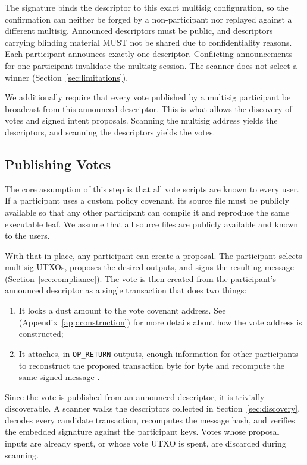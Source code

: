 \documentclass[11pt]{article}
\begin{document}
    The signature binds the descriptor to this exact multisig configuration, so the confirmation can neither be forged by a non-participant nor replayed against a different multisig. Announced descriptors must be public, and descriptors carrying blinding material MUST not be shared due to confidentiality reasons. Each participant announces exactly one descriptor. Conflicting announcements for one participant invalidate the multisig session. The scanner does not select a winner (Section~\ref{sec:limitations}).

    We additionally require that every vote published by a multisig participant be broadcast from this announced descriptor. This is what allows the discovery of votes and signed intent proposals. Scanning the multisig address yields the descriptors, and scanning the descriptors yields the votes.

    \subsection{Publishing Votes}
    \label{sec:votes}

    The core assumption of this step is that all vote scripts are known to every user. If a participant uses a custom policy covenant, its source file must be publicly available so that any other participant can compile it and reproduce the same executable leaf. We assume that all source files are publicly available and known to the users.

    With that in place, any participant can create a proposal. The participant selects multisig UTXOs, proposes the desired outputs, and signs the resulting message (Section~\ref{sec:compliance}). The vote is then created from the participant's announced descriptor as a single transaction that does two things:

    \begin{enumerate}
        \item It locks a dust amount to the vote covenant address. See  (Appendix~\ref{app:construction}) for more details about how the vote address is constructed;
        \item It attaches, in \texttt{OP\_RETURN} outputs, enough information for other participants to reconstruct the proposed transaction byte for byte and recompute the same signed message
        \cite{native-multisig-onchain-encoder}.
    \end{enumerate}

    Since the vote is published from an announced descriptor, it is trivially discoverable. A scanner walks the descriptors collected in Section~\ref{sec:discovery}, decodes every candidate transaction, recomputes the message hash, and verifies the embedded signature against the participant keys. Votes whose proposal inputs are already spent, or whose vote UTXO is spent, are discarded during scanning.
\end{document}
